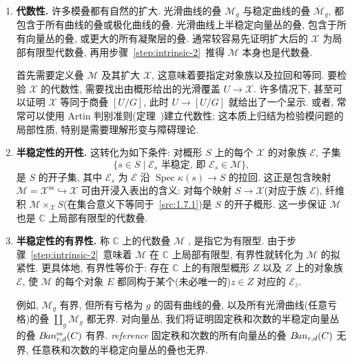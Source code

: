 \begin{enumerate}[步骤 1: ]
\item\textbf{代数性.} 许多模叠都有自然的扩大. 光滑曲线的叠 $\mathcal M_g$ 与稳定曲线的叠 $\overline{\mathcal M}_g$, 都包含于所有曲线的叠或极化曲线的叠. 光滑曲线上半稳定向量丛的叠, 包含于所有向量丛的叠, 或更大的所有凝聚层的叠. 通常较容易先证明扩大后的 $\mathcal X$ 为局部有限型代数叠, 再用步骤~\ref{step:intrinsic-2}~推得 $\mathcal M$ 本身也是代数叠.

首先需要定义叠 $\mathcal M$ 及其扩大 $\mathcal X$, 这意味着要指定对象族以及拉回和等同. 要检验 $\mathcal X$ 的代数性, 需要找出由概形给出的光滑覆盖 $U\to\mathcal X$. 许多情况下, 甚至可以证明 $\mathcal X$ 等同于商叠 $[U/G]$, 此时 $U\to[U/G]$ 就给出了一个呈示. 或者, 常常可以使用 Artin 判别准则(定理~)建立代数性; 这本质上归结为检验模问题的局部性质, 特别是需要理解形变与障碍理论.

\item\textbf{半稳定性的开性.} 这转化为如下条件: 对概形 $S$ 上的每个 $\mathcal X$ 的对象族 $\mathcal E$, 子集
\begin{equation}\label{src:1.7.1}
\{s\in S\mid\mathcal E_s\text{ 半稳定, 即 }\mathcal E_s\in\mathcal M\},
\end{equation}
是 $S$ 的开子集, 其中 $\mathcal E_s$ 为 $\mathcal E$ 沿 $\operatorname{Spec}\kappa(s)\to S$ 的拉回. 这正是包含映射 $\mathcal M=\mathcal X^{\mathrm{ss}}\hookrightarrow\mathcal X$ 可由开浸入表出的含义: 对每个映射 $S\to\mathcal X$(对应于族 $\mathcal E$), 纤维积 $\mathcal M\times_{\mathcal X}S$(在集合意义下等同于~\eqref{src:1.7.1})是 $S$ 的开子概形. 这一步保证 $\mathcal M$ 也是 $\mathbb C$ 上局部有限型的代数叠.

\item\textbf{半稳定性的有界性.} 称 $\mathbb C$ 上的代数叠 $\mathcal M$ , 是指它为有限型. 由于步骤~\ref{step:intrinsic-2}~意味着 $\mathcal M$ 在 $\mathbb C$ 上局部有限型, 有界性就转化为 $\mathcal M$ 的拟紧性. 更具体地, 有界性等价于: 存在 $\mathbb C$ 上的有限型概形 $Z$ 以及 $Z$ 上的对象族 $\mathcal E$, 使 $\mathcal M$ 的每个对象 $E$ 都同构于某个(未必唯一的)$z\in Z$ 对应的 $\mathcal E_z$.

例如, $\mathcal M_g$ 有界, 但所有亏格为 $g$ 的固有曲线的叠, 以及所有光滑曲线(任意亏格)的叠 $\coprod_g\mathcal M_g$ 都无界. 对向量丛, 我们将证明固定秩和次数的半稳定向量丛的叠 $B\!un_{r,d}^{\mathrm{ss}}(C)$ 有界. \textit{reference} 固定秩和次数的所有向量丛的叠 $B\!un_{r,d}(C)$ 无界, 任意秩和次数的半稳定向量丛的叠也无界.


\end{enumerate}
